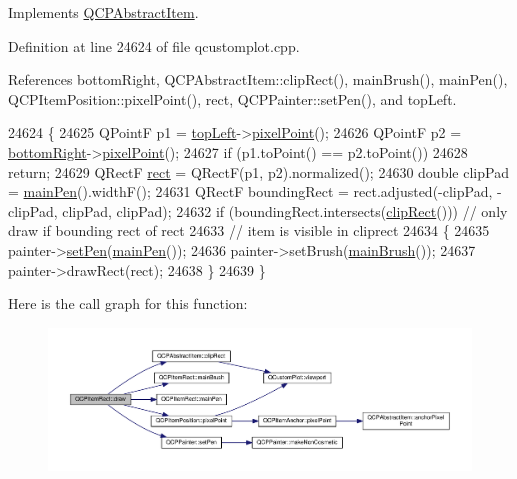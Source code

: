 Implements \hyperlink{class_q_c_p_abstract_item_ad0dc056f650c3ca73414e6b4f01674ef}{Q\+C\+P\+Abstract\+Item}.



Definition at line 24624 of file qcustomplot.\+cpp.



References bottom\+Right, Q\+C\+P\+Abstract\+Item\+::clip\+Rect(), main\+Brush(), main\+Pen(), Q\+C\+P\+Item\+Position\+::pixel\+Point(), rect, Q\+C\+P\+Painter\+::set\+Pen(), and top\+Left.


\begin{DoxyCode}
24624                                           \{
24625   QPointF p1 = \hyperlink{class_q_c_p_item_rect_aa70feeef173489b03c3fbe906a5023c4}{topLeft}->\hyperlink{class_q_c_p_item_position_ae490f9c76ee2ba33752c495d3b6e8fb5}{pixelPoint}();
24626   QPointF p2 = \hyperlink{class_q_c_p_item_rect_a409f3bfe615a7e322bb3d4d193d85b26}{bottomRight}->\hyperlink{class_q_c_p_item_position_ae490f9c76ee2ba33752c495d3b6e8fb5}{pixelPoint}();
24627   \textcolor{keywordflow}{if} (p1.toPoint() == p2.toPoint())
24628     \textcolor{keywordflow}{return};
24629   QRectF \hyperlink{_gen_blob_8m_aea8f6815d9a63491fc422c5572c6b3c3}{rect} = QRectF(p1, p2).normalized();
24630   \textcolor{keywordtype}{double} clipPad = \hyperlink{class_q_c_p_item_rect_afa0fb7c6328a1e197ecd537de36daf8f}{mainPen}().widthF();
24631   QRectF boundingRect = rect.adjusted(-clipPad, -clipPad, clipPad, clipPad);
24632   \textcolor{keywordflow}{if} (boundingRect.intersects(\hyperlink{class_q_c_p_abstract_item_a538e25ff8856534582f5b2b400a46405}{clipRect}())) \textcolor{comment}{// only draw if bounding rect of rect}
24633                                            \textcolor{comment}{// item is visible in cliprect}
24634   \{
24635     painter->\hyperlink{class_q_c_p_painter_af9c7a4cd1791403901f8c5b82a150195}{setPen}(\hyperlink{class_q_c_p_item_rect_afa0fb7c6328a1e197ecd537de36daf8f}{mainPen}());
24636     painter->setBrush(\hyperlink{class_q_c_p_item_rect_ab0bd8e272e822ec851ba5b0c20e9200e}{mainBrush}());
24637     painter->drawRect(rect);
24638   \}
24639 \}
\end{DoxyCode}


Here is the call graph for this function\+:\nopagebreak
\begin{figure}[H]
\begin{center}
\leavevmode
\includegraphics[width=350pt]{class_q_c_p_item_rect_a18cd583638b876cdd50f1a155ec182aa_cgraph}
\end{center}
\end{figure}


